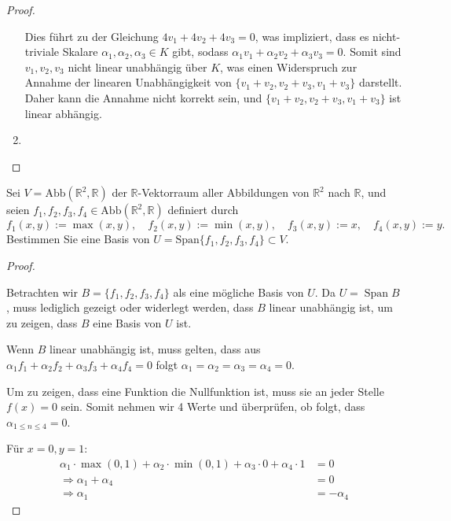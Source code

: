 \documentclass{../problemset}
\begin{document}
\begin{problem}
\begin{proof}
\begin{enumerate}
		      Dies führt zu der Gleichung $4v_1 + 4v_2 + 4v_3 = 0$, was impliziert, dass es nicht-triviale Skalare $\alpha_1, \alpha_2, \alpha_3 \in K$ gibt, sodass $\alpha_1 v_1 + \alpha_2 v_2 + \alpha_3 v_3 = 0$.
		      Somit sind $v_1, v_2, v_3$ nicht linear unabhängig über $K$, was einen Widerspruch zur Annahme der linearen Unabhängigkeit von $\{v_1+v_2, v_2+v_3, v_1+v_3\}$ darstellt.
		      Daher kann die Annahme nicht korrekt sein, und $\{v_1+v_2, v_2+v_3, v_1+v_3\}$ ist linear abhängig.

		\item
	\end{enumerate}
\end{proof}
\end{problem}

\pagebreak

\begin{problem}
Sei $V = \text{Abb}(\mathbb{R}^2, \mathbb{R})$ der $\mathbb{R}$-Vektorraum aller Abbildungen von $\mathbb{R}^2$ nach $\mathbb{R}$, und seien $f_1, f_2, f_3, f_4 \in \text{Abb}(\mathbb{R}^2, \mathbb{R})$ definiert durch
\[ f_1(x, y) := \max(x, y), \quad f_2(x, y) := \min(x, y), \quad f_3(x, y) := x, \quad f_4(x, y) := y. \]
Bestimmen Sie eine Basis von $U = \text{Span}\{f_1, f_2, f_3, f_4\} \subset V$.
\begin{proof}
	$ $

	Betrachten wir $B = \{f_1, f_2, f_3, f_4\}$ als eine mögliche Basis von $U$.
	Da $U = \operatorname{Span} B$, muss lediglich gezeigt oder widerlegt werden, dass $B$ linear unabhängig ist, um zu zeigen, dass $B$ eine Basis von $U$ ist.

	Wenn $B$ linear unabhängig ist, muss gelten, dass aus $\alpha_1 f_1 + \alpha_2 f_2 + \alpha_3 f_3 + \alpha_4 f_4 = 0$ folgt $\alpha_1 = \alpha_2 = \alpha_3 = \alpha_4 = 0$.

	Um zu zeigen, dass eine Funktion die Nullfunktion ist, muss sie an jeder Stelle $f(x) = 0$ sein.
	Somit nehmen wir 4 Werte und überprüfen, ob folgt, dass $\alpha_{1 \le n \le 4} = 0$.

	Für $x = 0, y = 1$:
	\begin{align*}
		\alpha_1 \cdot \max(0, 1) + \alpha_2 \cdot \min(0, 1) + \alpha_3 \cdot 0 + \alpha_4 \cdot 1 & = 0         \\
		\Rightarrow \alpha_1 + \alpha_4                                                             & = 0         \\
		\Rightarrow \alpha_1                                                                        & = -\alpha_4
	\end{align*}


\end{proof}
\end{problem}
\end{document}

